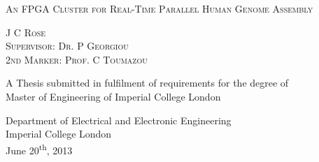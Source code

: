 \thispagestyle{empty}

\begin{center}
\null {}
\renewcommand{\baselinestretch}{2}
\doublespacing
\textsc{\huge{An FPGA Cluster for Real-Time  Parallel Human Genome Assembly}}



\textsc{\large{J C Rose}} \\
\textsc{\large{Supervisor: Dr. P Georgiou}} \\
\textsc{\large{2nd Marker: Prof. C Toumazou}} 

A Thesis submitted in fulfilment of requirements for the degree of \\
Master of Engineering of Imperial College London




Department of Electrical and Electronic Engineering\\
Imperial College London\\
June 20\textsuperscript{th}, 2013
\end{center}


